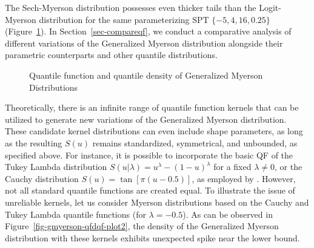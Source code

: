 \documentclass[
  fleqn,
  deca,
  blindrev
]{informs4}
\begin{document}
The Sech-Myerson distribution possesses even thicker tails than the
Logit-Myerson distribution for the same parameterizing SPT
\(\{-5,4,16, 0.25\}\) (Figure~\ref{fig-gmyerson-qfdqf-plot1}). In
Section~\ref{sec-compareqf}, we conduct a comparative analysis of
different variations of the Generalized Myerson distribution alongside
their parametric counterparts and other quantile distributions.

\begin{figure}


\caption{\label{fig-gmyerson-qfdqf-plot1}Quantile function and quantile
density of Generalized Myerson Distributions}

\end{figure}%

Theoretically, there is an infinite range of quantile function kernels
that can be utilized to generate new variations of the Generalized
Myerson distribution. These candidate kernel distributions can even
include shape parameters, as long as the resulting \(S(u)\) remains
standardized, symmetrical, and unbounded, as specified above. For
instance, it is possible to incorporate the basic QF of the Tukey Lambda
distribution \(S(u\vert\lambda)=u^\lambda-(1-u)^\lambda\) for a fixed
\(\lambda \neq 0\), or the Cauchy distribution
\(S(u)=\tan[\pi(u-0.5)]\), as employed by
\citet{hadlock2019GeneralizedJohnsonQuantileParameterized}. However, not
all standard quantile functions are created equal. To illustrate the
issue of unreliable kernels, let us consider Myerson distributions based
on the Cauchy and Tukey Lambda quantile functions (for
\(\lambda=-0.5\)). As can be observed in
Figure~\ref{fig-gmyerson-qfdqf-plot2}, the density of the Generalized
Myerson distribution with these kernels exhibits unexpected spike near
the lower bound.
\end{document}
